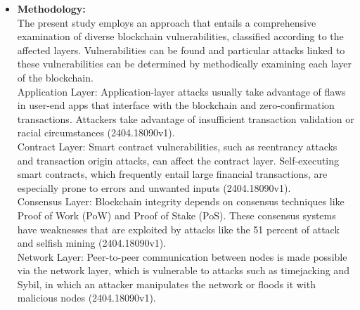 \documentclass[12pt,a4paper]{article}
\begin{document}
\begin{itemize}
\begin{itemize}
        \item \textbf{Methodology:} \\
The present study employs an approach that entails a comprehensive examination of
diverse blockchain vulnerabilities, classified according to the affected layers.
Vulnerabilities can be found and particular attacks linked to these vulnerabilities can be
determined by methodically examining each layer of the blockchain.
\\
Application Layer:
Application-layer attacks usually take advantage of flaws in user-end apps that
interface with the blockchain and zero-confirmation transactions. Attackers take
advantage of insufficient transaction validation or racial circumstances (2404.18090v1).
\\
Contract Layer:
Smart contract vulnerabilities, such as reentrancy attacks and transaction origin
attacks, can affect the contract layer. Self-executing smart contracts, which frequently
entail large financial transactions, are especially prone to errors and unwanted inputs
(2404.18090v1).
\\
Consensus Layer:
Blockchain integrity depends on consensus techniques like Proof of Work (PoW) and
Proof of Stake (PoS). These consensus systems have weaknesses that are exploited by
attacks like the 51 percent of attack and selfish mining (2404.18090v1).
\\
Network Layer:
Peer-to-peer communication between nodes is made possible via the network layer,
which is vulnerable to attacks such as timejacking and Sybil, in which an attacker
manipulates the network or floods it with malicious nodes (2404.18090v1).
  

\end{itemize}
\end{itemize}
\end{document}
